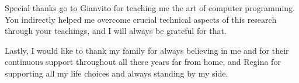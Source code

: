 \vspace{0.2cm}
Special thanks go to Gianvito for teaching me the art of computer programming. You indirectly helped me overcome crucial technical aspects of this research through your teachings, and I will always be grateful for that.

\vspace{0.2cm}
Lastly, I would like to thank my family for always believing in me and for their continuous support throughout all these years far from home, and Regina for supporting all my life choices and always standing by my side.

\endgroup